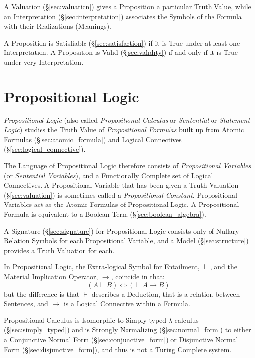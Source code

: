 A Valuation (\S\ref{sec:valuation}) gives a Proposition a particular
Truth Value, while an Interpretation (\S\ref{sec:interpretation})
associates the Symbols of the Formula with their Realizations
(Meanings).

A Proposition is Satisfiable (\S\ref{sec:satisfaction}) if it is True
under at least one Interpretation. A Proposition is Valid
(\S\ref{sec:validity}) if and only if it is True under very
Interpretation.



\section{Propositional Logic}\label{sec:propositional_logic}

\emph{Propositional Logic} (also called \emph{Propositional Calculus}
or \emph{Sentential} or \emph{Statement Logic}) studies the Truth
Value of \emph{Propositional Formulas} built up from Atomic Formulas
(\S\ref{sec:atomic_formula}) and Logical Connectives
(\S\ref{sec:logical_connective}).

The Language of Propositional Logic therefore consists of
\emph{Propositional Variables} (or \emph{Sentential Variables}), and a
Functionally Complete set of Logical Connectives. A Propositional
Variable that has been given a Truth Valuation (\S\ref{sec:valuation})
is sometimes called a \emph{Propositional Constant}. Propositional
Variables act as the Atomic Formulas of Propositional Logic. A
Propositional Formula is equivalent to a Boolean Term
(\S\ref{sec:boolean_algebra}).

A Signature (\S\ref{sec:signature}) for Propositional Logic consists
only of Nullary Relation Symbols for each Propositional Variable, and
a Model (\S\ref{sec:structure}) provides a Truth Valuation for each.

In Propositional Logic, the Extra-logical Symbol for Entailment,
$\vdash$, and the Material Implication Operator, $\rightarrow$,
coincide in that:
\[(A \vdash B) \Leftrightarrow (\vdash A \rightarrow B)\]
but the difference is that $\vdash$ describes a Deduction, that is a
relation between Sentences, and $\rightarrow$ is a Logical Connective
within a Formula.

Propositional Calculus is Isomorphic to Simply-typed
$\lambda$-calculus (\S\ref{sec:simply_typed}) and is Strongly
Normalizing (\S\ref{sec:normal_form}) to either a Conjunctive Normal
Form (\S\ref{sec:conjunctive_form}) or Disjunctive Normal Form
(\S\ref{sec:disjunctive_form}), and thus is not a Turing Complete
system.

